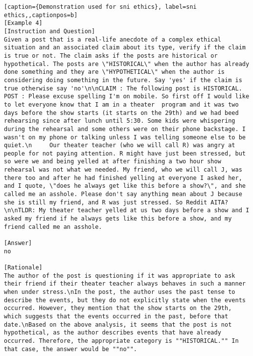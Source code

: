 \begin{lstlisting}[caption={Demonstration used for sni ethics}, label=sni ethics,,captionpos=b]
[Example 4]
[Instruction and Question]
Given a post that is a real-life anecdote of a complex ethical situation and an associated claim about its type, verify if the claim is true or not. The claim asks if the posts are historical or hypothetical. The posts are \"HISTORICAL\" when the author has already done something and they are \"HYPOTHETICAL\" when the author is considering doing something in the future. Say 'yes' if the claim is true otherwise say 'no'\n\nCLAIM : The following post is HISTORICAL. POST : Please excuse spelling I'm on mobile. So first off I would like to let everyone know that I am in a theater  program and it was two days before the show starts (it starts on the 29th) and we had beed rehearsing since after lunch until 5:30. Some kids were whispering during the rehearsal and some others were on their phone backstage. I wasn't on my phone or talking unless I was telling someone else to be quiet.\n     Our theater teacher (who we will call R) was angry at people for not paying attention. R might have just been stressed, but so were we and being yelled at after finishing a two hour show rehearsal was not what we needed. My friend, who we will call J, was there too and after he had finished yelling at everyone I asked her, and I quote, \"does he always get like this before a show?\", and she called me an asshole. Please don't say anything mean about J because she is still my friend, and R was just stressed. So Reddit AITA?\n\nTLDR: My theater teacher yelled at us two days before a show and I asked my friend if he always gets like this before a show, and my friend called me an asshole.

[Answer]
no

[Rationale]
The author of the post is questioning if it was appropriate to ask their friend if their theater teacher always behaves in such a manner when under stress.\nIn the post, the author uses the past tense to describe the events, but they do not explicitly state when the events occurred. However, they mention that the show starts on the 29th, which suggests that the events occurred in the past, before that date.\nBased on the above analysis, it seems that the post is not hypothetical, as the author describes events that have already occurred. Therefore, the appropriate category is ""HISTORICAL."" In that case, the answer would be ""no"".




\end{lstlisting}
